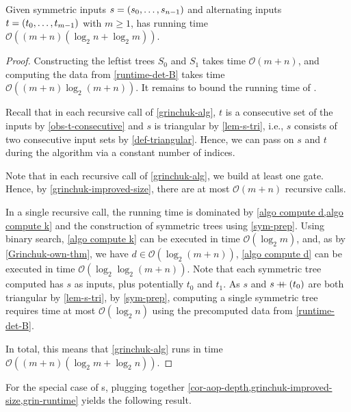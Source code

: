 \begin{proposition} \label{grin-runtime}
 Given symmetric inputs $s = \left({s_0, \dotsc, s_{n-1}}\right)$ and alternating inputs $t = \left({t_0, \dotsc, t_{m-1}}\right)$
 with $m \geq 1$,
  has running time $\mathcal O((m+n) (\log_2 n + \log_2 m))$.
 \begin{proof}
  Constructing the leftist trees $S\!_0$ and $S\!_1$ takes time $\mathcal O(m + n)$,
  and computing the data from \cref{runtime-det-B}
  takes time $\mathcal O((m+n) \log_2(m + n))$.
  It remains to bound the running time of .

  Recall that in each recursive call of \cref{grinchuk-alg},
  $t$ is a consecutive set of the inputs by \cref{obs-t-consecutive}
  and $s$ is triangular by \cref{lem-s-tri},
  i.e., $s$ consists of two consecutive input sets by \cref{def-triangular}.
  Hence, we can pass on $s$ and $t$ during the algorithm via a constant number of indices.

  Note that in each recursive call of \cref{grinchuk-alg},
  we build at least one gate.
  Hence, by \cref{grinchuk-improved-size}, there are at most $\mathcal O(m + n)$ recursive calls.

  In a single recursive call, the running time is dominated by \cref{algo compute d,algo compute k}
  and the construction of symmetric trees using \cref{sym-prep}.
  Using binary search, \cref{algo compute k} can be executed in time $\mathcal O(\log_2 m)$, and,
  as by \cref{Grinchuk-own-thm}, we have $d \in \mathcal O(\log_2(m + n))$,
  \cref{algo compute d} can be executed in time $\mathcal O(\log_2\log_2(m + n))$.
  Note that each symmetric tree computed has $s$ as inputs,
  plus potentially $t_0$ and $t_1$.
  As $s$ and $s \mathbin{+\mkern-8mu+} (t_0)$ are both triangular by \cref{lem-s-tri},
  by \cref{sym-prep},
  computing a single symmetric tree requires time at most $\mathcal O(\log_2 n)$
  using the precomputed data from \cref{runtime-det-B}.

  In total, this means that \cref{grinchuk-alg} runs in time $\mathcal O((m + n)(\log_2 m + \log_2 n))$.
 \end{proof}
\end{proposition}

For the special case of \aop{}s, plugging together
\cref{cor-aop-depth,grinchuk-improved-size,grin-runtime} yields the following result.



